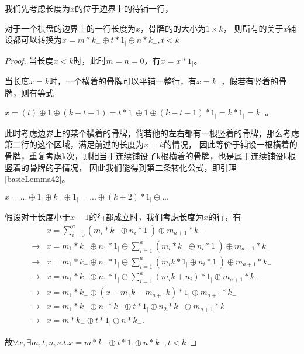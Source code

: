 我们先考虑长度为$x$的位于边界上的待铺一行，
\begin{theorem}
    对于一个棋盘的边界上的一行长度为$x$，骨牌的的大小为$1 \times k$，
    则所有的关于$x$铺设都可以转换为$x = m * k_{-} \oplus t * 1_{\vert} \oplus n * k_{-}, t < k$
    \label{basic-theorem-4}
\end{theorem}
\begin{proof}

    当长度$x < k$时，此时$m = n = 0$，有$x = x * 1_{\vert}$。

    当长度$x = k$时，一个横着的骨牌可以平铺一整行，有$x = k_{-}$，假若有竖着的骨牌，则有等式

    $x = (t) \oplus 1 \oplus (k - t - 1) = t * 1_{\vert} \oplus 1 \oplus (k - t - 1) * 1_{\vert}= k * 1_{\vert} = k_{-}$。

    此时考虑边界上的某个横着的骨牌，倘若他的左右都有一根竖着的骨牌，那么考虑第二行的这个区域，满足前述的长度为$x = k$的情况，
    因此等价于铺设一根横着的骨牌，重复考虑k次，则相当于连续铺设了k根横着的骨牌，也是属于连续铺设k根竖着的骨牌的子情况，
    因此我们能得到第二条转化公式，即引理\ref{basicLemma42}。

    \begin{lemma}
        $x = ... \oplus 1_{\vert} \oplus  k_{-} \oplus 1_{\vert} = ... \oplus (k + 2) * 1_{\vert} \oplus ...$
        \label{basicLemma42}
    \end{lemma}

    假设对于长度小于$x - 1$的行都成立时，我们考虑长度为$x$的行，有
    $$
        \begin{aligned}
                        & x = \sum_{i=0}^{a} (m_i * k_{-} \oplus n_i * 1_{\vert}) \oplus m_{a+1} * k_{-}                                                \\
            \rightarrow & x = m_1 * k_{-} \oplus n_1 * 1_{\vert} \oplus \sum_{i=1}^{a} (m_i * k_{-} \oplus n_i * 1_{\vert})\oplus m_{a+1} * k_{-}       \\
            \rightarrow & x = m_1 * k_{-} \oplus n_1 * 1_{\vert} \oplus \sum_{i=1}^{a} (m_ik * 1_{\vert} \oplus n_i * 1_{\vert}) \oplus m_{a+1} * k_{-} \\
            \rightarrow & x = m_1 * k_{-} \oplus n_1 * 1_{\vert} \oplus \sum_{i=1}^{a} (m_ik + n_i) * 1_{\vert} \oplus m_{a+1} * k_{-}                  \\
            \rightarrow & x = m_1 * k_{-} \oplus (x - m_1k - m_{a+1}k) * 1_{\vert} \oplus m_{a+1} * k_{-}                                               \\
            \rightarrow & x = m_1 * k_{-} \oplus n_1 * k_{-} \oplus t * 1_{\vert} \oplus n_2 * k_{-} \oplus m_{a+1} * k_{-}                             \\
            \rightarrow & x = m * k_{-} \oplus t * 1_{\vert} \oplus n * k_{-}.
        \end{aligned}
    $$

    故$\forall x, \exists m, t, n, s.t. x = m * k_{-} \oplus t * 1_{\vert} \oplus n * k_{-}, t < k$
\end{proof}

